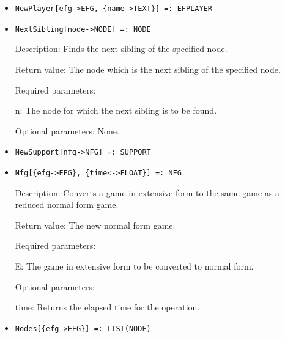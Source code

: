 \begin{itemize}
\item
\protect \large \begin{verbatim}
NewPlayer[efg->EFG, {name->TEXT}] =: EFPLAYER 
\end{verbatim}\normalsize

\item
\protect \large \begin{verbatim}
NextSibling[node->NODE] =: NODE
\end{verbatim}\normalsize

\bd
\item
[Description:] Finds the next sibling of the specified node.
\item
[Return value:] The node which is the next sibling of the specified
node.
\item
[Required parameters:]\hfil\null

\bd
\item
[n:] The node for which the next sibling is to be found.
\ed

\item
[Optional parameters:] None.
\ed


\item
\protect \large \begin{verbatim}
NewSupport[nfg->NFG] =: SUPPORT
\end{verbatim}\normalsize

\item
\protect \large \begin{verbatim}
Nfg[{efg->EFG}, {time<->FLOAT}] =: NFG
\end{verbatim}\normalsize

\bd
\item
[Description:] Converts a game in extensive form to the same
game as a reduced normal form game.
\item
[Return value:] The new normal form game.
\item
[Required parameters:]\hfil\null
	
\bd
\item
[E:] The game in extensive form to be converted to normal form.
\ed

\item
[Optional parameters:]\hfil\null
	
\bd
\item
[time:] Returns the elapsed time for the operation.
\ed
\ed

\item
\protect \large \begin{verbatim} 
Nodes[{efg->EFG}] =: LIST(NODE)
\end{verbatim}\normalsize


\end{itemize}
